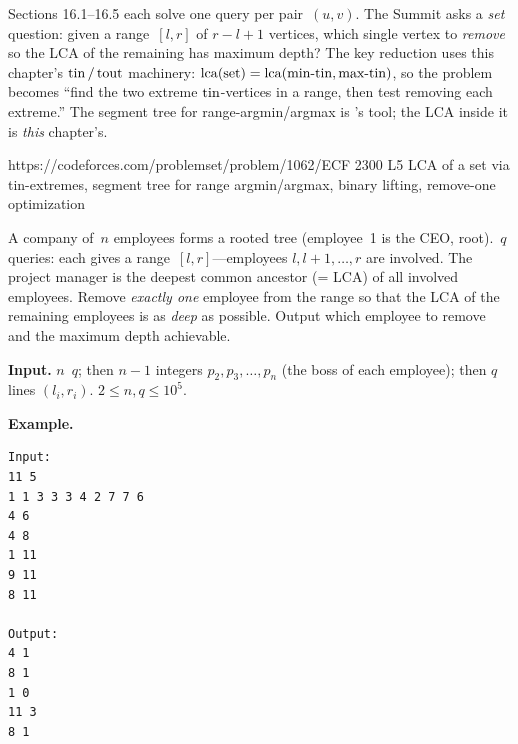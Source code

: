 
\begin{notebox}
Sections 16.1--16.5 each solve one query per pair~\((u,v)\). The Summit
asks a \emph{set} question: given a range~\([l,r]\) of \(r{-}l{+}1\)
vertices, which single vertex to \emph{remove} so the LCA of the
remaining has maximum depth? The key reduction uses this chapter's
\(\operatorname{tin}/\operatorname{tout}\) machinery: \(\operatorname{lca}(\text{set}) =
\operatorname{lca}(\text{min-tin},\text{max-tin})\), so the problem becomes ``find
the two extreme \(\operatorname{tin}\)-vertices in a range, then test removing each
extreme.'' The segment tree for range-argmin/argmax is 's tool;
the LCA inside it is \emph{this} chapter's.
\end{notebox}

  {https://codeforces.com/problemset/problem/1062/E}{CF 2300 L5}
  {LCA of a set via tin-extremes, segment tree for range argmin/argmax, binary lifting, remove-one optimization}

\begin{problemstatement}[CF 1062E Company]
A company of~\(n\) employees forms a rooted tree (employee~1 is the
CEO, root).~\(q\) queries: each gives a range~\([l,r]\)---employees
\(l, l{+}1, \ldots, r\) are involved. The project manager is the
deepest common ancestor (= LCA) of all involved employees. Remove
\emph{exactly one} employee from the range so that the LCA of the
remaining employees is as \emph{deep} as possible. Output which
employee to remove and the maximum depth achievable.

\textbf{Input.} \(n\)~\(q\); then \(n{-}1\) integers
\(p_2, p_3, \ldots, p_n\) (the boss of each employee); then \(q\) lines
\((l_i, r_i)\). \(2 \le n, q \le 10^5\).

\textbf{Example.}
\begin{verbatim}
Input:
11 5
1 1 3 3 3 4 2 7 7 6
4 6
4 8
1 11
9 11
8 11

Output:
4 1
8 1
1 0
11 3
8 1
\end{verbatim}
\end{problemstatement}

\begin{attemptgate}
\end{attemptgate}

